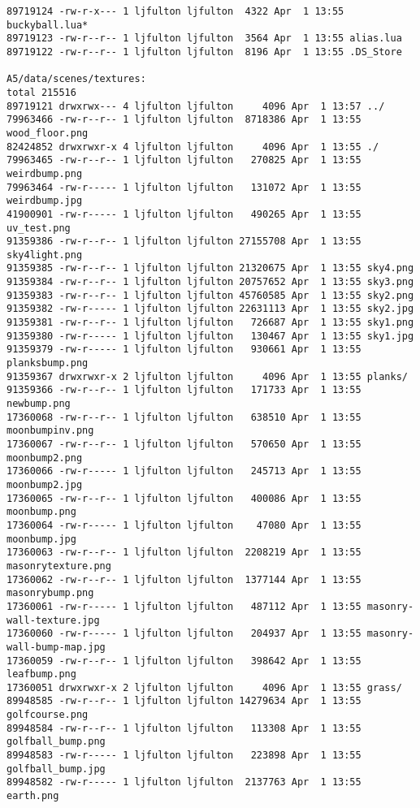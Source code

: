 \documentclass[12pt]{article}
\begin{document}
\begin{verbatim}
89719124 -rw-r-x--- 1 ljfulton ljfulton  4322 Apr  1 13:55 buckyball.lua*
89719123 -rw-r--r-- 1 ljfulton ljfulton  3564 Apr  1 13:55 alias.lua
89719122 -rw-r--r-- 1 ljfulton ljfulton  8196 Apr  1 13:55 .DS_Store

A5/data/scenes/textures:
total 215516
89719121 drwxrwx--- 4 ljfulton ljfulton     4096 Apr  1 13:57 ../
79963466 -rw-r--r-- 1 ljfulton ljfulton  8718386 Apr  1 13:55 wood_floor.png
82424852 drwxrwxr-x 4 ljfulton ljfulton     4096 Apr  1 13:55 ./
79963465 -rw-r--r-- 1 ljfulton ljfulton   270825 Apr  1 13:55 weirdbump.png
79963464 -rw-r----- 1 ljfulton ljfulton   131072 Apr  1 13:55 weirdbump.jpg
41900901 -rw-r----- 1 ljfulton ljfulton   490265 Apr  1 13:55 uv_test.png
91359386 -rw-r--r-- 1 ljfulton ljfulton 27155708 Apr  1 13:55 sky4light.png
91359385 -rw-r--r-- 1 ljfulton ljfulton 21320675 Apr  1 13:55 sky4.png
91359384 -rw-r--r-- 1 ljfulton ljfulton 20757652 Apr  1 13:55 sky3.png
91359383 -rw-r--r-- 1 ljfulton ljfulton 45760585 Apr  1 13:55 sky2.png
91359382 -rw-r----- 1 ljfulton ljfulton 22631113 Apr  1 13:55 sky2.jpg
91359381 -rw-r--r-- 1 ljfulton ljfulton   726687 Apr  1 13:55 sky1.png
91359380 -rw-r----- 1 ljfulton ljfulton   130467 Apr  1 13:55 sky1.jpg
91359379 -rw-r----- 1 ljfulton ljfulton   930661 Apr  1 13:55 planksbump.png
91359367 drwxrwxr-x 2 ljfulton ljfulton     4096 Apr  1 13:55 planks/
91359366 -rw-r--r-- 1 ljfulton ljfulton   171733 Apr  1 13:55 newbump.png
17360068 -rw-r--r-- 1 ljfulton ljfulton   638510 Apr  1 13:55 moonbumpinv.png
17360067 -rw-r--r-- 1 ljfulton ljfulton   570650 Apr  1 13:55 moonbump2.png
17360066 -rw-r----- 1 ljfulton ljfulton   245713 Apr  1 13:55 moonbump2.jpg
17360065 -rw-r--r-- 1 ljfulton ljfulton   400086 Apr  1 13:55 moonbump.png
17360064 -rw-r----- 1 ljfulton ljfulton    47080 Apr  1 13:55 moonbump.jpg
17360063 -rw-r--r-- 1 ljfulton ljfulton  2208219 Apr  1 13:55 masonrytexture.png
17360062 -rw-r--r-- 1 ljfulton ljfulton  1377144 Apr  1 13:55 masonrybump.png
17360061 -rw-r----- 1 ljfulton ljfulton   487112 Apr  1 13:55 masonry-wall-texture.jpg
17360060 -rw-r----- 1 ljfulton ljfulton   204937 Apr  1 13:55 masonry-wall-bump-map.jpg
17360059 -rw-r--r-- 1 ljfulton ljfulton   398642 Apr  1 13:55 leafbump.png
17360051 drwxrwxr-x 2 ljfulton ljfulton     4096 Apr  1 13:55 grass/
89948585 -rw-r--r-- 1 ljfulton ljfulton 14279634 Apr  1 13:55 golfcourse.png
89948584 -rw-r--r-- 1 ljfulton ljfulton   113308 Apr  1 13:55 golfball_bump.png
89948583 -rw-r----- 1 ljfulton ljfulton   223898 Apr  1 13:55 golfball_bump.jpg
89948582 -rw-r----- 1 ljfulton ljfulton  2137763 Apr  1 13:55 earth.png

\end{verbatim}
\end{document}
